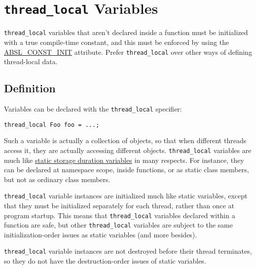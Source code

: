 
\section{\texorpdfstring{\texttt{thread_local}}{\texttwoinferior} Variables}\label{sec:thread_local-variables}
\texttt{thread_local} variables that aren't declared inside a function must be initialized with a true compile-time constant, and this must be enforced by using the \href{https://github.com/abseil/abseil-cpp/blob/master/absl/base/attributes.h}{ABSL\_CONST\_INIT} attribute. Prefer \texttt{thread_local} over other ways of defining thread-local data.

\subsection{Definition}
Variables can be declared with the \texttt{thread_local} specifier:
\begin{verbatim}
thread_local Foo foo = ...;
\end{verbatim}

Such a variable is actually a collection of objects, so that when different threads access it, they are actually accessing different objects. \texttt{thread_local} variables are much like \hyperref[sec:static-and-global-variables]{static storage duration variables} in many respects. For instance, they can be declared at namespace scope, inside functions, or as static class members, but not as ordinary class members.

\texttt{thread_local} variable instances are initialized much like static variables, except that they must be initialized separately for each thread, rather than once at program startup. This means that \texttt{thread_local} variables declared within a function are safe, but other \texttt{thread_local} variables are subject to the same initialization-order issues as static variables (and more besides).

\texttt{thread_local} variable instances are not destroyed before their thread terminates, so they do not have the destruction-order issues of static variables.


